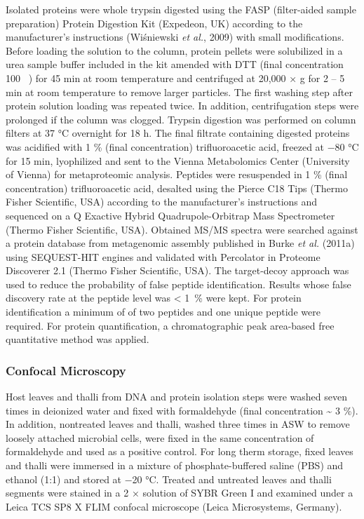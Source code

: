 \documentclass[12pt,]{article}
\begin{document}
Isolated proteins were whole trypsin digested using the FASP
(filter-aided sample preparation) Protein Digestion Kit (Expedeon, UK)
according to the manufacturer's instructions (Wiśniewski \emph{et al.},
2009) with small modifications. Before loading the solution to the
column, protein pellets were solubilized in a urea sample buffer
included in the kit amended with DTT (final concentration 100
\si{\milli\Molar}) for 45 \si{\minute} at room temperature and
centrifuged at 20,000 × g for 2 -- 5 \si{\minute} at room temperature to
remove larger particles. The first washing step after protein solution
loading was repeated twice. In addition, centrifugation steps were
prolonged if the column was clogged. Trypsin digestion was performed on
column filters at 37 \si{\degreeCelsius} overnight for 18 \si{\hour}.
The final filtrate containing digested proteins was acidified with 1
\si{\percent} (final concentration) trifluoroacetic acid, freezed at
\num{-80} \si{\degreeCelsius} for 15 \si{\minute}, lyophilized and sent
to the Vienna Metabolomics Center (University of Vienna) for
metaproteomic analysis. Peptides were resuspended in 1 \si{\percent}
(final concentration) trifluoroacetic acid, desalted using the Pierce
C18 Tips (Thermo Fisher Scientific, USA) according to the manufacturer's
instructions and sequenced on a Q Exactive Hybrid Quadrupole-Orbitrap
Mass Spectrometer (Thermo Fisher Scientific, USA). Obtained MS/MS
spectra were searched against a protein database from metagenomic
assembly published in Burke \emph{et al.} (2011a) using SEQUEST-HIT
engines and validated with Percolator in Proteome Discoverer 2.1 (Thermo
Fisher Scientific, USA). The target-decoy approach was used to reduce
the probability of false peptide identification. Results whose false
discovery rate at the peptide level was \SI{< 1}{\percent} were kept.
For protein identification a minimum of of two peptides and one unique
peptide were required. For protein quantification, a chromatographic
peak area-based free quantitative method was applied.

\subsubsection{Confocal Microscopy}\label{confocal-microscopy}

Host leaves and thalli from DNA and protein isolation steps were washed
seven times in deionized water and fixed with formaldehyde (final
concentration \textasciitilde{} 3 \si{\percent}). In addition,
nontreated leaves and thalli, washed three times in ASW to remove
loosely attached microbial cells, were fixed in the same concentration
of formaldehyde and used as a positive control. For long therm storage,
fixed leaves and thalli were immersed in a mixture of phosphate-buffered
saline (PBS) and ethanol (1:1) and stored at \num{-20}
\si{\degreeCelsius}. Treated and untreated leaves and thalli segments
were stained in a 2 × solution of SYBR Green I and examined under a
Leica TCS SP8 X FLIM confocal microscope (Leica Microsystems, Germany).
\end{document}
